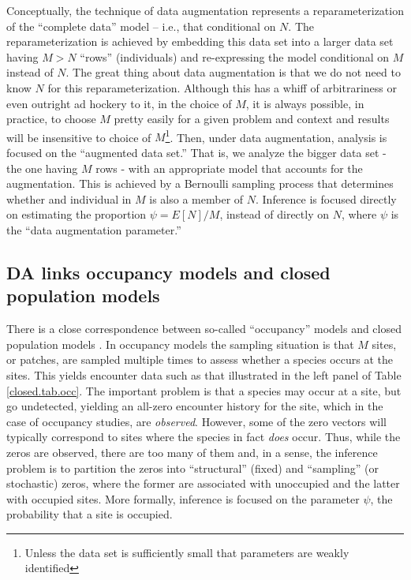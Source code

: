 Conceptually, the technique of data augmentation represents  a reparameterization of the
``complete data'' model -- i.e., that conditional on $N$. The
reparameterization is achieved by embedding this data set into a
larger data set having $M> N$ ``rows'' (individuals) and re-expressing
the model conditional on $M$ instead of $N$. The great thing about
data augmentation is that we do not need to know $N$ for this reparameterization.
Although this has a whiff of
arbitrariness or even outright ad hockery to it, in the choice of $M$,
it is always possible, in practice, to choose $M$ pretty easily for
a given problem and context and results will be insensitive to choice
of $M$\footnote{Unless the data set is sufficiently small that parameters are
weakly identified}.
Then, under data augmentation, analysis
is focused on the ``augmented data set.'' That is, we analyze the bigger
data set - the one having $M$ rows - with an appropriate model that
accounts for the augmentation. This is achieved by a Bernoulli sampling process that determines whether and individual in $M$ is also a member of $N$.
Inference is focused directly on
estimating the proportion $\psi = E[N]/M$, instead of directly on $N$,
where $\psi$ is the ``data augmentation parameter.''


\subsection{DA links occupancy models and closed population models}


There is a close correspondence between so-called ``occupancy'' models and closed
population models \citet[see][sec. 5.6]{royle_dorazio:2008}.
In occupancy models \citep{mackenzie_etal:2002, tyre_etal:2003} the
sampling situation is that $M$ sites, or patches, are sampled multiple
times to assess whether a species occurs at the sites.  This yields
encounter data such as that illustrated in the left panel of Table
\ref{closed.tab.occ}. The important problem is that a species may
occur at a site, but go undetected, yielding an all-zero encounter
history for the site, which in the case of occupancy studies, are {\it
  observed}. However, some of the zero vectors will typically correspond
to sites where the species in fact {\it does} occur. Thus, while the
zeros are observed, there are too many of them and, in a sense, the
inference problem is to partition the zeros into ``structural''
(fixed) and ``sampling'' (or stochastic) zeros, where the former are
associated with unoccupied and the latter with occupied sites. More
formally, inference is focused on the parameter $\psi$, the
probability that a site is occupied.

